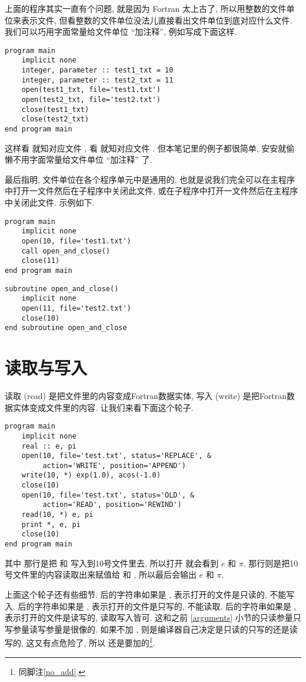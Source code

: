 上面的程序其实一直有个问题, 就是因为 Fortran 太上古了, 所以用整数的文件单位来表示文件, 但看整数的文件单位没法儿直接看出文件单位到底对应什么文件. 我们可以巧用字面常量给文件单位 ``加注释'', 例如写成下面这样.
\begin{lstlisting}
program main
    implicit none
    integer, parameter :: test1_txt = 10
    integer, parameter :: test2_txt = 11
    open(test1_txt, file='test1.txt')
    open(test2_txt, file='test2.txt')
    close(test1_txt)
    close(test2_txt)
end program main
\end{lstlisting}
这样看  就知对应文件 , 看  就知对应文件 . 但本笔记里的例子都很简单, 安安就偷懒不用字面常量给文件单位 ``加注释'' 了.

最后指明, 文件单位在各个程序单元中是通用的, 也就是说我们完全可以在主程序中打开一文件然后在子程序中关闭此文件, 或在子程序中打开一文件然后在主程序中关闭此文件. 示例如下.
\begin{lstlisting}
program main
    implicit none
    open(10, file='test1.txt')
    call open_and_close()
    close(11)
end program main
\end{lstlisting}
\begin{lstlisting}
subroutine open_and_close()
    implicit none
    open(11, file='test2.txt')
    close(10)
end subroutine open_and_close
\end{lstlisting}

\section{读取与写入}

读取 (read) 是把文件里的内容变成Fortran数据实体, 写入 (write) 是把Fortran数据实体变成文件里的内容. 让我们来看下面这个轮子. 
\begin{lstlisting}
program main
    implicit none
    real :: e, pi
    open(10, file='test.txt', status='REPLACE', &
         action='WRITE', position='APPEND')
    write(10, *) exp(1.0), acos(-1.0)
    close(10)
    open(10, file='test.txt', status='OLD', &
         action='READ', position='REWIND')
    read(10, *) e, pi
    print *, e, pi
    close(10)
end program main
\end{lstlisting}
其中  那行是把  和  写入到10号文件里去, 所以打开  就会看到 $ e $ 和 $ \pi $.   那行则是把10号文件里的内容读取出来赋值给 和 , 所以最后会输出 $ e $ 和 $ \pi $. 

上面这个轮子还有些细节.   后的字符串如果是 , 表示打开的文件是只读的, 不能写入.   后的字符串如果是 , 表示打开的文件是只写的, 不能读取.   后的字符串如果是 , 表示打开的文件是读写的, 读取写入皆可. 这和之前 \ref{arguments} 小节的只读参量只写参量读写参量是很像的. 如果不加 , 则是编译器自己决定是只读的只写的还是读写的, 这又有点危险了, 所以  还是要加的\footnote{同脚注\ref{no_add}.}. 

